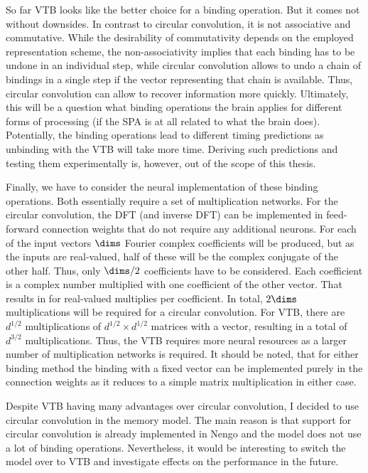 So far VTB looks like the better choice for a binding operation.
But it comes not without downsides.
In contrast to circular convolution, it is not associative and commutative.
While the desirability of commutativity depends on the employed representation scheme, the non-associativity implies that each binding has to be undone in an individual step, while circular convolution allows to undo a chain of bindings in a single step if the vector representing that chain is available.
Thus, circular convolution can allow to recover information more quickly.
Ultimately, this will be a question what binding operations the brain applies for different forms of processing (if the SPA is at all related to what the brain does).
Potentially, the binding operations lead to different timing predictions as unbinding with the VTB will take more time.
Deriving such predictions and testing them experimentally is, however, out of the scope of this thesis.

Finally, we have to consider the neural implementation of these binding operations.
Both essentially require a set of multiplication networks.
For the circular convolution, the DFT (and inverse DFT) can be implemented in feed-forward connection weights that do not require any additional neurons.
For each of the input vectors $\dims$ Fourier complex coefficients will be produced, but as the inputs are real-valued, half of these will be the complex conjugate of the other half.
Thus, only $\dims / 2$ coefficients have to be considered.
Each coefficient is a complex number multiplied with one coefficient of the other vector.
That results in for real-valued multiplies per coefficient.
In total, $2\dims$ multiplications will be required for a circular convolution.
For VTB, there are $d^{1/2}$ multiplications of $d^{1/2} \times d^{1/2}$ matrices with a vector, resulting in a total of $d^{3/2}$ multiplications.
Thus, the VTB requires more neural resources as a larger number of multiplication networks is required.
It should be noted, that for either binding method the binding with a fixed vector can be implemented purely in the connection weights as it reduces to a simple matrix multiplication in either case.

Despite VTB having many advantages over circular convolution, I decided to use circular convolution in the memory model.
The main reason is that support for circular convolution is already implemented in Nengo and the model does not use a lot of binding operations.
Nevertheless, it would be interesting to switch the model over to VTB and investigate effects on the performance in the future.


